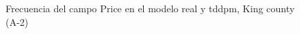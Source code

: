 \begin{figure}[H]
    \centering
    
    \caption{Frecuencia del campo Price en el modelo real y tddpm, King county (A-2)}
    \label{frecuency-tddpm-price}
\end{figure}